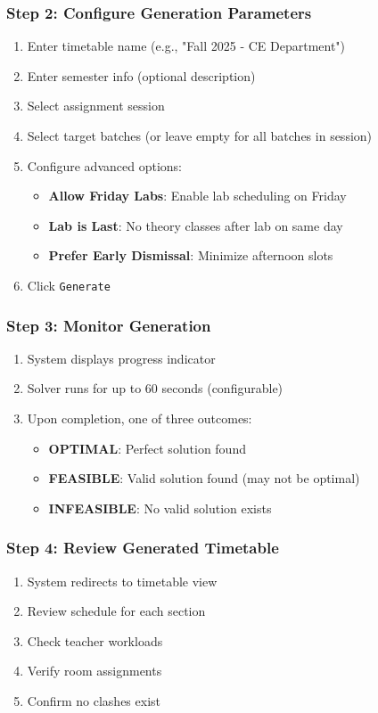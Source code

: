\documentclass[12pt,a4paper]{article}
\begin{document}
\subsubsection{Step 2: Configure Generation Parameters}
\begin{enumerate}
    \item Enter timetable name (e.g., "Fall 2025 - CE Department")
    \item Enter semester info (optional description)
    \item Select assignment session
    \item Select target batches (or leave empty for all batches in session)
    \item Configure advanced options:
    \begin{itemize}
        \item \textbf{Allow Friday Labs}: Enable lab scheduling on Friday
        \item \textbf{Lab is Last}: No theory classes after lab on same day
        \item \textbf{Prefer Early Dismissal}: Minimize afternoon slots
    \end{itemize}
    \item Click \texttt{Generate}
\end{enumerate}


\subsubsection{Step 3: Monitor Generation}
\begin{enumerate}
    \item System displays progress indicator
    \item Solver runs for up to 60 seconds (configurable)
    \item Upon completion, one of three outcomes:
    \begin{itemize}
        \item \textbf{OPTIMAL}: Perfect solution found
        \item \textbf{FEASIBLE}: Valid solution found (may not be optimal)
        \item \textbf{INFEASIBLE}: No valid solution exists
    \end{itemize}
\end{enumerate}

\subsubsection{Step 4: Review Generated Timetable}
\begin{enumerate}
    \item System redirects to timetable view
    \item Review schedule for each section
    \item Check teacher workloads
    \item Verify room assignments
    \item Confirm no clashes exist
\end{enumerate}
\end{document}
